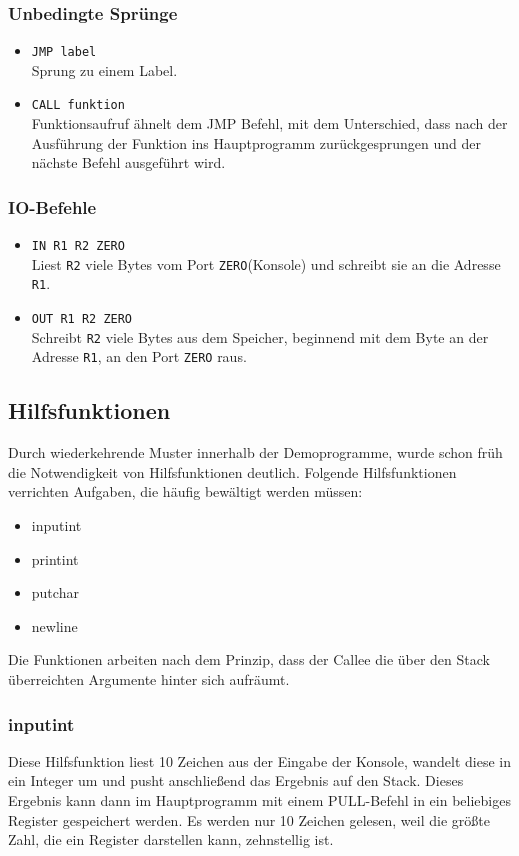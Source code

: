 \subsubsection{Unbedingte Sprünge}
 \begin{itemize}
 \item \texttt{JMP label}\\
 Sprung zu einem Label.
 \item \texttt{CALL funktion} \\
 Funktionsaufruf ähnelt dem JMP Befehl, mit dem Unterschied, dass nach der
Ausführung der Funktion ins Hauptprogramm zurückgesprungen und der nächste
Befehl ausgeführt wird.
 \end{itemize}
\subsubsection{IO-Befehle}
 \begin{itemize}
 \item \texttt{IN R1 R2 ZERO}\\
 Liest \texttt{R2} viele Bytes vom Port \texttt{ZERO}(Konsole) und schreibt sie
an die Adresse \texttt{R1}.
 \item \texttt{OUT R1 R2 ZERO}\\
 Schreibt \texttt{R2} viele Bytes aus dem Speicher, beginnend mit dem Byte an
der Adresse \texttt{R1}, an den Port \texttt{ZERO} raus.
 \end{itemize}





\subsection{Hilfsfunktionen}
Durch wiederkehrende Muster innerhalb der Demoprogramme, wurde schon früh die 
Notwendigkeit von Hilfsfunktionen deutlich. Folgende Hilfsfunktionen verrichten
Aufgaben, die häufig bewältigt werden müssen:
 \begin{itemize}
 \item inputint
 \item printint
 \item putchar
 \item newline
 \end{itemize}
 Die Funktionen arbeiten nach dem Prinzip, dass der Callee die über den Stack 
 überreichten Argumente hinter sich aufräumt.

\subsubsection{inputint}
Diese Hilfsfunktion liest 10 Zeichen aus der Eingabe der Konsole, wandelt diese
in ein Integer um und pusht anschließend das Ergebnis auf den Stack. Dieses
Ergebnis kann dann im Hauptprogramm mit einem PULL-Befehl in ein beliebiges
Register gespeichert werden. Es werden nur 10 Zeichen gelesen, weil die größte
Zahl, die ein Register darstellen kann, zehnstellig ist.

